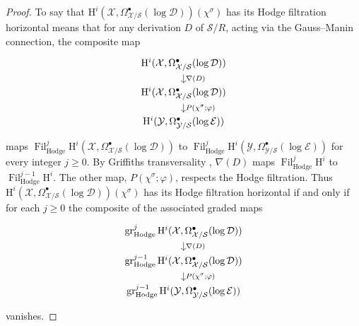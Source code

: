 \begin{proof}
To say that \(\mathrm{H}^i(\mathcal{X},\Omega^\bullet_{\mathcal{X}/\mathcal{S}}(\log\mathcal{D}))(\chi^\sigma)\) has its Hodge filtration horizontal means that for any derivation \(D\) of \(\mathcal{S}/R\), acting via the Gauss--Manin connection, the composite map
\[
\begin{tikzcd}[column sep=large,row sep=small]
\mathrm{H}^i(\mathcal{X},\Omega^\bullet_{\mathcal{X}/\mathcal{S}}(\log\mathcal{D}))
\arrow[d,"\nabla(D)"]\\
\mathrm{H}^i(\mathcal{X},\Omega^\bullet_{\mathcal{X}/\mathcal{S}}(\log\mathcal{D}))
\arrow[d,"P(\chi^\sigma;\varphi)"]\\
\mathrm{H}^i(\mathcal{Y},\Omega^\bullet_{\mathcal{Y}/\mathcal{S}}(\log\mathcal{E}))
\end{tikzcd}
\]
maps \(\operatorname{Fil}^j_{\mathrm{Hodge}}\mathrm{H}^i(\mathcal{X},\Omega^\bullet_{\mathcal{X}/\mathcal{S}}(\log\mathcal{D}))\) to \(\operatorname{Fil}^j_{\mathrm{Hodge}}\mathrm{H}^i(\mathcal{Y},\Omega^\bullet_{\mathcal{Y}/\mathcal{S}}(\log\mathcal{E}))\) for every integer \(j\geq0\). By Griffiths transversality \cite[1.4.1.6]{Ka-ASDE}, \(\nabla(D)\) maps \(\operatorname{Fil}^j_{\mathrm{Hodge}}\mathrm{H}^i\) to \(\operatorname{Fil}^{j-1}_{\mathrm{Hodge}}\mathrm{H}^i\). The other map, \(P(\chi^\sigma;\varphi)\), respects the Hodge filtration. Thus \(\mathrm{H}^i(\mathcal{X},\Omega^\bullet_{\mathcal{X}/\mathcal{S}}(\log\mathcal{D}))(\chi^\sigma)\) has its Hodge filtration horizontal if and only if for each \(j\geq0\) the composite of the associated graded maps
\[
\begin{tikzcd}[column sep=large,row sep=small]
\operatorname{gr}^j_{\mathrm{Hodge}}\mathrm{H}^i(\mathcal{X},\Omega^\bullet_{\mathcal{X}/\mathcal{S}}(\log\mathcal{D}))
\arrow[d,"\nabla(D)"]\\
\operatorname{gr}^{j-1}_{\mathrm{Hodge}}\mathrm{H}^i(\mathcal{X},\Omega^\bullet_{\mathcal{X}/\mathcal{S}}(\log\mathcal{D}))
\arrow[d,"P(\chi^\sigma;\varphi)"]\\
\operatorname{gr}^{j-1}_{\mathrm{Hodge}}\mathrm{H}^i(\mathcal{Y},\Omega^\bullet_{\mathcal{Y}/\mathcal{S}}(\log\mathcal{E}))
\end{tikzcd}
\]
vanishes.


\end{proof}
